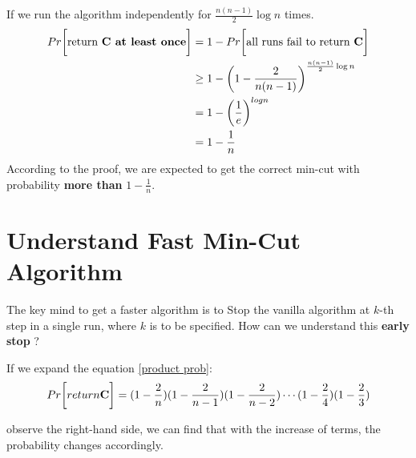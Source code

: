 \documentclass[a4paper, 12pt, titlepage]{article}
\begin{document}
If we run the algorithm independently for $\frac{n (n - 1)}{2} \log n$ times.
\begin{equation}
    \begin{aligned}
        Pr \bigg[ \text{return \textbf{C at least once}} \bigg] &= 1 - Pr \bigg[ \text{all runs fail to return \textbf{C}} \bigg] \\
                                                                           &\geq 1 - \bigg( 1 - \frac{2}{n ( n - 1)} \bigg)^{\frac{n (n - 1)}{2} \log n} \\
                                                                           &= 1 - \bigg( \frac{1}{e} \bigg)^{log n} \\
                                                                           &= 1 - \frac{1}{n}
    \end{aligned}
\end{equation}
According to the proof, we are expected to get the correct min-cut with probability \textbf{more than} $1 - \frac{1}{n}$.

\section{Understand Fast Min-Cut Algorithm}

The key mind to get a faster algorithm is to Stop the vanilla algorithm at $k$-th step in a single run, where $k$ is to be specified.
How can we understand this \textbf{early stop} ? 

If we expand the equation \ref{product prob}:
\begin{equation}
    Pr \bigg[ return \text{\textbf{C}} \bigg] = (1 - \frac{2}{n})(1 - \frac{2}{n - 1})(1 - \frac{2}{n - 2}) \cdots (1- \frac{2}{4})(1 - \frac{2}{3})
\end{equation}

observe the right-hand side, we can find that with the increase of terms, the probability changes accordingly.
\end{document}
